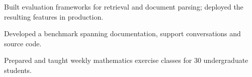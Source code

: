 \documentclass{cv}
\begin{document}
\makecvheader


\begin{cventry}[
    organisation = {Example Research},
    role         = {Research Engineer},
    dates        = {09/2024--Present},
    location     = {Zürich, Switzerland},
    url          = {https://example.com}
]
    \begin{cvbullets}
        \item Built evaluation frameworks for retrieval and document parsing; deployed the resulting features in production.
        \item Developed a benchmark spanning documentation, support conversations and source code.
    \end{cvbullets}
\end{cventry}

\begin{cventry}[
    organisation = {Example University},
    role         = {Teaching Assistant},
    dates        = {09/2022--06/2024}
]
    \begin{cvbullets}
        \item Prepared and taught weekly mathematics exercise classes for 30 undergraduate students.
    \end{cvbullets}
\end{cventry}

\end{document}
